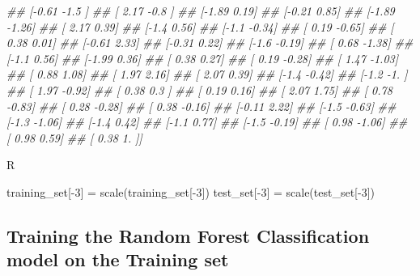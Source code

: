 \documentclass[
]{book}
\newenvironment{Shaded}{\begin{snugshade}}{\end{snugshade}}
\newcommand{\CommentTok}[1]{\textcolor[rgb]{0.56,0.35,0.01}{\textit{#1}}}
\newcommand{\DecValTok}[1]{\textcolor[rgb]{0.00,0.00,0.81}{#1}}
\newcommand{\FunctionTok}[1]{\textcolor[rgb]{0.00,0.00,0.00}{#1}}
\newcommand{\NormalTok}[1]{#1}
\newcommand{\OtherTok}[1]{\textcolor[rgb]{0.56,0.35,0.01}{#1}}
\newcommand{\SpecialCharTok}[1]{\textcolor[rgb]{0.00,0.00,0.00}{#1}}
\theoremstyle{definition}
\theoremstyle{definition}
\theoremstyle{definition}
\theoremstyle{definition}
\theoremstyle{remark}
\begin{document}
\begin{Shaded}
\begin{Highlighting}[]
\CommentTok{\#\#  [{-}0.61 {-}1.5 ]}
\CommentTok{\#\#  [ 2.17 {-}0.8 ]}
\CommentTok{\#\#  [{-}1.89  0.19]}
\CommentTok{\#\#  [{-}0.21  0.85]}
\CommentTok{\#\#  [{-}1.89 {-}1.26]}
\CommentTok{\#\#  [ 2.17  0.39]}
\CommentTok{\#\#  [{-}1.4   0.56]}
\CommentTok{\#\#  [{-}1.1  {-}0.34]}
\CommentTok{\#\#  [ 0.19 {-}0.65]}
\CommentTok{\#\#  [ 0.38  0.01]}
\CommentTok{\#\#  [{-}0.61  2.33]}
\CommentTok{\#\#  [{-}0.31  0.22]}
\CommentTok{\#\#  [{-}1.6  {-}0.19]}
\CommentTok{\#\#  [ 0.68 {-}1.38]}
\CommentTok{\#\#  [{-}1.1   0.56]}
\CommentTok{\#\#  [{-}1.99  0.36]}
\CommentTok{\#\#  [ 0.38  0.27]}
\CommentTok{\#\#  [ 0.19 {-}0.28]}
\CommentTok{\#\#  [ 1.47 {-}1.03]}
\CommentTok{\#\#  [ 0.88  1.08]}
\CommentTok{\#\#  [ 1.97  2.16]}
\CommentTok{\#\#  [ 2.07  0.39]}
\CommentTok{\#\#  [{-}1.4  {-}0.42]}
\CommentTok{\#\#  [{-}1.2  {-}1.  ]}
\CommentTok{\#\#  [ 1.97 {-}0.92]}
\CommentTok{\#\#  [ 0.38  0.3 ]}
\CommentTok{\#\#  [ 0.19  0.16]}
\CommentTok{\#\#  [ 2.07  1.75]}
\CommentTok{\#\#  [ 0.78 {-}0.83]}
\CommentTok{\#\#  [ 0.28 {-}0.28]}
\CommentTok{\#\#  [ 0.38 {-}0.16]}
\CommentTok{\#\#  [{-}0.11  2.22]}
\CommentTok{\#\#  [{-}1.5  {-}0.63]}
\CommentTok{\#\#  [{-}1.3  {-}1.06]}
\CommentTok{\#\#  [{-}1.4   0.42]}
\CommentTok{\#\#  [{-}1.1   0.77]}
\CommentTok{\#\#  [{-}1.5  {-}0.19]}
\CommentTok{\#\#  [ 0.98 {-}1.06]}
\CommentTok{\#\#  [ 0.98  0.59]}
\CommentTok{\#\#  [ 0.38  1.  ]]}
\end{Highlighting}
\end{Shaded}

R

\begin{Shaded}
\begin{Highlighting}[]
\NormalTok{training\_set[}\SpecialCharTok{{-}}\DecValTok{3}\NormalTok{] }\OtherTok{=} \FunctionTok{scale}\NormalTok{(training\_set[}\SpecialCharTok{{-}}\DecValTok{3}\NormalTok{])}
\NormalTok{test\_set[}\SpecialCharTok{{-}}\DecValTok{3}\NormalTok{] }\OtherTok{=} \FunctionTok{scale}\NormalTok{(test\_set[}\SpecialCharTok{{-}}\DecValTok{3}\NormalTok{])}
\end{Highlighting}
\end{Shaded}

\hypertarget{training-the-random-forest-classification-model-on-the-training-set}{%
\subsection{Training the Random Forest Classification model on the Training set}\label{training-the-random-forest-classification-model-on-the-training-set}}
\end{document}
